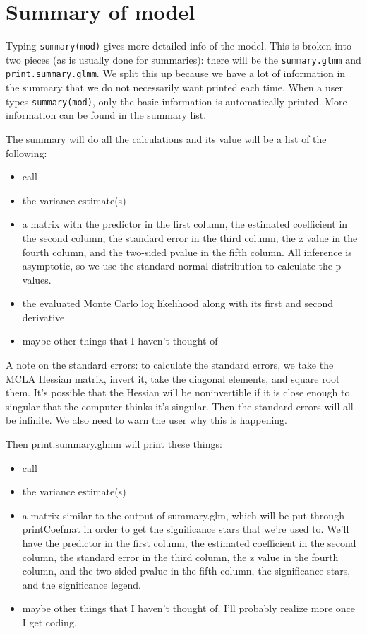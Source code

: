 \documentclass{article}
\begin{document}
\section{Summary of model}
Typing \texttt{summary(mod)}  gives more detailed info of the model. This is broken into two pieces (as is usually done for summaries): there will be the \texttt{summary.glmm} and \texttt{print.summary.glmm}. We split this up because we have a lot of information in the summary that we do not necessarily want printed each time. When a user types \texttt{summary(mod)}, only the  basic information is automatically printed. More information can be found in the summary list.

The summary will do all the calculations and its value will be a list of the following:
\begin{itemize}
\item call
\item the variance estimate(s)
\item a matrix with the predictor in the first column, the estimated coefficient in the second column, the standard error in the third column, the z value in the fourth column, and the two-sided pvalue  in the fifth column. All inference is asymptotic, so we use the standard normal distribution to calculate the p-values.
\item the evaluated Monte Carlo log likelihood along with its first and second derivative
\item maybe other things that I haven't thought of
\end{itemize}

A note on the standard errors: to calculate the standard errors, we take the MCLA Hessian matrix, invert it, take the diagonal elements, and square root them. It's possible that the Hessian will be noninvertible if it is close enough to singular that the computer thinks it's singular.  Then the standard errors will all be infinite. We also need to warn the user why this is happening.

Then print.summary.glmm will print these things:
\begin{itemize}
\item call
\item the variance estimate(s)
\item a matrix similar to the output of summary.glm, which will be put through printCoefmat in order to get the significance stars that we're used to. We'll have the predictor in the first column, the estimated coefficient in the second column, the standard error in the third column, the z value in the fourth column, and the two-sided pvalue  in the fifth column, the significance stars, and the significance legend.
\item maybe other things that I haven't thought of. I'll probably realize more once I get coding.
\end{itemize}
\end{document}
